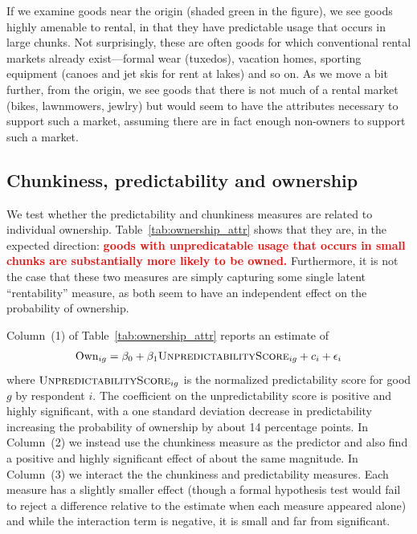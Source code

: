 \documentclass[11pt]{article}
\newcommand{\important}[1]{\textcolor{red}{\textbf{#1}}}
\newcommand{\important}[1]{#1}
\begin{document}
If we examine goods near the origin (shaded green in the figure), we see goods highly amenable to rental, in that they have predictable usage that occurs in large chunks. 
Not surprisingly, these are often goods for which conventional rental markets already exist---formal wear (tuxedos), vacation homes, sporting equipment (canoes and jet skis for rent at lakes) and so on.
As we move a bit further, from the origin, we see goods that there is not much of a rental market (bikes, lawnmowers, jewlry) but would seem to have the attributes necessary to support such a market, assuming there are in fact enough non-owners to support such a market.  

\subsection{Chunkiness, predictability and ownership} 

We test whether the predictability and chunkiness measures are related to individual ownership. 
Table~\ref{tab:ownership_attr} shows that they are, in the expected direction:
\important{goods with unpredicatable usage that occurs in small chunks are substantially more likely to be owned.}
Furthermore, it is not the case that these two measures are simply capturing some single latent ``rentability'' measure, as both seem to have an independent effect on the probability of ownership. 

 

Column~(1) of Table~\ref{tab:ownership_attr} reports an estimate of 
\begin{align}
  \text{Own}_{ig} = \beta_0 + \beta_1 \textsc{UnpredictabilityScore}_{ig} + c_i + \epsilon_i
\end{align} 
where $\textsc{UnpredictabilityScore}_{ig}$ is the normalized predictability score for good $g$ by respondent $i$.
The coefficient on the unpredictability score is positive and highly significant, with a one standard deviation decrease in predictability increasing the probability of ownership by about 14 percentage points. 
In Column~(2) we instead use the chunkiness measure as the predictor and also find a positive and highly significant effect of about the same magnitude. 
In Column~(3) we interact the the chunkiness and predictability measures.
Each measure has a slightly smaller effect (though a formal hypothesis test would fail to reject a difference relative to the estimate when each measure appeared alone) and while the interaction term is negative, it is small and far from significant.
\end{document}

